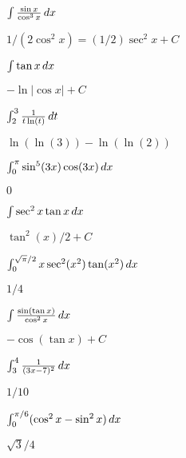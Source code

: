 \begin{exercises}
\begin{exercise} $\int {\sin x\over\cos^3 x}\, d x$
\begin{answer} $1/(2\cos^2 x)=(1/2)\sec^2x+C$
\end{answer}\end{exercise}

\begin{exercise} $\int\tan x\, d x$
\begin{answer} $-\ln|\cos x|+C$
\end{answer}\end{exercise}

\begin{exercise} $\int_{2}^{3} \frac{1}{t\ln(t)} \, d t$
\begin{answer} $\ln(\ln(3)) - \ln(\ln(2))$
\end{answer}\end{exercise}

\begin{exercise}  $\int_0^\pi\sin^5(3x)\cos(3x)\, d x$
\begin{answer} $0$
\end{answer}\end{exercise}

\begin{exercise} $\int\sec^2x\tan x\, d x$
\begin{answer} $\tan^2(x)/2+C$
\end{answer}\end{exercise}

\begin{exercise} $\int_0^{\sqrt{\pi}/2} x\sec^2(x^2)\tan(x^2)\, d x$
\begin{answer} $1/4$
\end{answer}\end{exercise}

\begin{exercise} $\int {\sin(\tan x)\over\cos^2x}\, d x$
\begin{answer} $-\cos(\tan x)+C$
\end{answer}\end{exercise}

\begin{exercise} $\int_3^4 {1\over(3x-7)^2}\, d x$
\begin{answer} $1/10$
\end{answer}\end{exercise}

\begin{exercise} $\int_0^{\pi/6}(\cos^2x - \sin^2x)\, d x$
\begin{answer} $\sqrt3/4$
\end{answer}\end{exercise}


\end{exercises}
